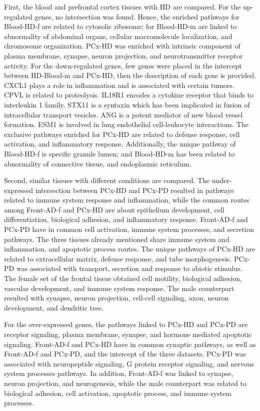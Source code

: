 First, the blood and prefrontal cortex tissues with HD are compared. For the up-regulated genes, no intersection was found. Hence, the enriched pathways for Blood-HD-f are related to cytosolic ribosome; for Blood-HD-m are linked to abnormality of abdominal organs, cellular macromolecule localization, and chromosome organization. PCx-HD was enriched with intrinsic component of plasma membrane, synapse, neuron projection, and neurotransmitter receptor activity. For the down-regulated genes, few genes were placed in the intercept between HD-Blood-m and PCx-HD, then the description of each gene is provided. CXCL1 plays a role in inflammation and is associated with certain tumors. CPVL is related to proteolysis. IL18R1 encodes a cytokine receptor that binds to interleukin 1 family. STX11 is a syntaxin which has been implicated in fusion of intracellular transport vesicles. ANG is a potent mediator of new blood vessel formation. ESM1 is involved in lung endothelial cell-leukocyte interactions. The exclusive pathways enriched for PCx-HD are related to defense response, cell activation, and inflammatory response. Additionally, the unique pathway of Blood-HD-f is specific granule lumen; and Blood-HD-m has been related to abnormality of connective tissue, and endoplasmic reticulum. 

Second, similar tissues with different conditions are compared. The under-expressed intersection between PCx-HD and PCx-PD resulted in pathways related to immune system response and inflammation, while the common routes among Front-AD-f and PCx-HD are about epithelium development, cell differentiation, biological adhesion, and inflammatory response. Front-AD-f and PCx-PD have in common cell activation, immune system processes, and secretion pathways. The three tissues already mentioned share immune system and inflammation, and apoptotic process routes. The unique pathways of PCx-HD are related to extracellular matrix, defense response, and tube morphogenesis. PCx-PD was associated with transport, secretion and response to abiotic stimulus. The female set of the frontal tissue obtained cell motility, biological adhesion, vascular development, and immune system response. The male counterpart resulted with synapse, neuron projection, cell-cell signaling, axon, neuron development, and dendritic tree.

For the over-expressed genes, the pathways linked to PCx-HD and PCx-PD are receptor signaling, plasma membrane, synapse, and hormone mediated apoptotic signaling. Front-AD-f and PCx-HD have in common synaptic pathways, as well as Front-AD-f and PCx-PD, and the intercept of the three datasets. PCx-PD was associated with neuropeptide signaling, G protein receptor signaling, and nervous system processes pathways. In addition, Front-AD-f was linked to synapse, neuron projection, and neurogenesis, while the male counterpart was related to biological adhesion, cell activation, apoptotic process, and immune system processes.

